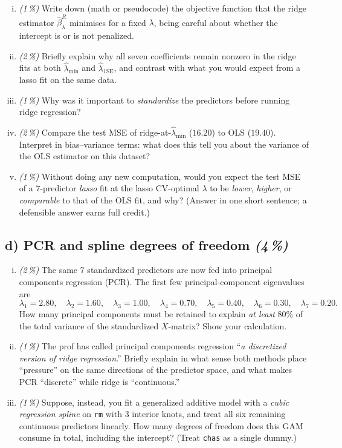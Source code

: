 \documentclass[11pt,a4paper]{article}
\newcommand{\subpoints}[1]{\textit{(#1\,\%)}}
\begin{document}
\begin{enumerate}[(i)]
  \item \subpoints{1} Write down (math or pseudocode) the objective function that the ridge estimator $\hat\beta^R_\lambda$ minimises for a fixed $\lambda$, being careful about whether the intercept is or is not penalized.
  \item \subpoints{2} Briefly explain why all seven coefficients remain nonzero in the ridge fits at both $\hat\lambda_{\min}$ and $\hat\lambda_{1\text{SE}}$, and contrast with what you would expect from a lasso fit on the same data.
  \item \subpoints{1} Why was it important to \emph{standardize} the predictors before running ridge regression?
  \item \subpoints{2} Compare the test MSE of ridge-at-$\hat\lambda_{\min}$ ($16.20$) to OLS ($19.40$). Interpret in bias--variance terms: what does this tell you about the variance of the OLS estimator on this dataset?
  \item \subpoints{1} Without doing any new computation, would you expect the test MSE of a $7$-predictor \emph{lasso} fit at the lasso CV-optimal $\lambda$ to be \emph{lower}, \emph{higher}, or \emph{comparable} to that of the OLS fit, and why? (Answer in one short sentence; a defensible answer earns full credit.)
\end{enumerate}

\subsection*{d) PCR and spline degrees of freedom \subpoints{4}}

\begin{enumerate}[(i)]
  \item \subpoints{2} The same $7$ standardized predictors are now fed into principal components regression (PCR). The first few principal-component eigenvalues are
  $$\lambda_1 = 2.80,\quad \lambda_2 = 1.60,\quad \lambda_3 = 1.00,\quad \lambda_4 = 0.70,\quad \lambda_5 = 0.40,\quad \lambda_6 = 0.30,\quad \lambda_7 = 0.20.$$
  How many principal components must be retained to explain \emph{at least} $80\%$ of the total variance of the standardized $X$-matrix? Show your calculation.
  \item \subpoints{1} The prof has called principal components regression ``\emph{a discretized version of ridge regression}.'' Briefly explain in what sense both methods place ``pressure'' on the same directions of the predictor space, and what makes PCR ``discrete'' while ridge is ``continuous.''
  \item \subpoints{1} Suppose, instead, you fit a generalized additive model with a \emph{cubic regression spline} on \texttt{rm} with $3$ interior knots, and treat all six remaining continuous predictors linearly. How many degrees of freedom does this GAM consume in total, including the intercept? (Treat \texttt{chas} as a single dummy.)
\end{enumerate}
\end{document}
